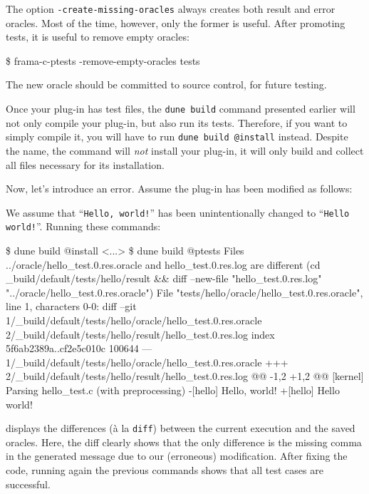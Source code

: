 The option \texttt{-create-missing-oracles} always creates both result and
error oracles. Most of the time, however, only the former is useful.
After promoting tests, it is useful to remove empty oracles:

\begin{shell}
\$ frama-c-ptests -remove-empty-oracles tests
\end{shell}

The new oracle should be committed to source control, for future testing.

\begin{important}
  Once your plug-in has test files, the \verb|dune build| command presented
  earlier will not only compile your plug-in, but also run its tests.
  Therefore, if you want to simply compile it, you will have to run
  \verb|dune build @install| instead. Despite the name, the command will
       {\em not} install your plug-in, it will only build and collect all
       files necessary for its installation.
\end{important}

Now, let's introduce an error. Assume the plug-in has been modified as follows:


We assume that ``\texttt{Hello, world!}'' has been unintentionally changed to
``\texttt{Hello world!}''.
Running these commands:
\begin{shell}[breaklines=true]
\$ dune build @install
<...>
\$ dune build @ptests
Files ../oracle/hello_test.0.res.oracle and hello_test.0.res.log are different
 (cd _build/default/tests/hello/result && diff --new-file "hello_test.0.res.log" "../oracle/hello_test.0.res.oracle")
File "tests/hello/oracle/hello_test.0.res.oracle", line 1, characters 0-0:
diff --git 1/_build/default/tests/hello/oracle/hello_test.0.res.oracle 2/_build/default/tests/hello/result/hello_test.0.res.log
index 5f6ab2389a..cf2e5c010c 100644
--- 1/_build/default/tests/hello/oracle/hello_test.0.res.oracle
+++ 2/_build/default/tests/hello/result/hello_test.0.res.log
@@ -1,2 +1,2 @@
 [kernel] Parsing hello_test.c (with preprocessing)
-[hello] Hello, world!
+[hello] Hello world!
\end{shell}
displays the differences (à la \texttt{diff}) between the current execution
and the saved oracles. Here, the diff clearly shows that the only difference is
the missing comma in the generated message due to our (erroneous) modification.
After fixing the \ocaml code, running again the previous commands shows that all
test cases are successful.

